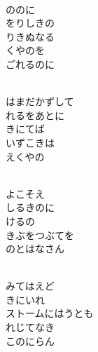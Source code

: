 \documentclass[10pt,b5j]{tarticle} %
\begin{document}
\begin{enumerate}
\begin{minipage}[c]{\blocksize}
        \vspace{\linespace}
        \item~\\
        ののに\\
        をりしきの\\
        りきぬなる\\
        くやのを\\
        ごれるのに
        
        \vspace{\linespace}
        \item~\\
        はまだかずして\\
        れるをあとに\\
        きにてば\\
        いずこきは\\
        えくやの
        
        \vspace{\linespace}
        \item~\\
        よこそえ\\
        しるきのに\\
        けるの\\
        きぶをつぶてを\\
        のとはなさん
        
        \vspace{\linespace}
        \item~\\
        みてはえど\\
        きにいれ\\
        ストームにはうとも\\
        れじてなき\\
        このにらん
        

\end{minipage}
\end{enumerate}
\end{document}
